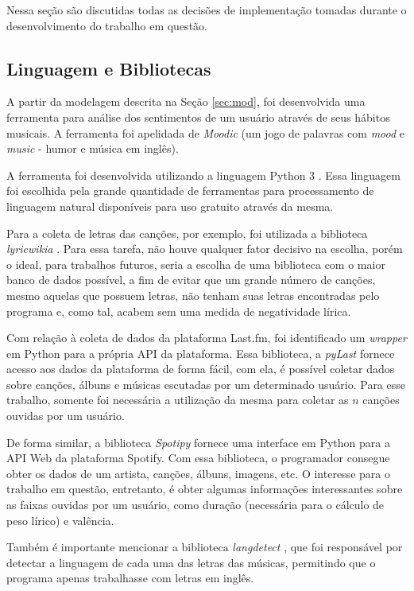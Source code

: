 Nessa seção são discutidas todas as decisões de implementação tomadas
durante o desenvolvimento do trabalho em questão.

\subsection{Linguagem e Bibliotecas}

A partir da modelagem descrita na Seção \ref{sec:mod}, foi desenvolvida
uma ferramenta para análise dos sentimentos de um usuário através de seus
hábitos musicais. A ferramenta foi apelidada de \textit{Moodic} (um jogo
de palavras com \textit{mood} e \textit{music} - humor e música em inglês).

A ferramenta foi desenvolvida utilizando a linguagem Python 3 \cite{python3}.
Essa linguagem foi escolhida pela grande quantidade de ferramentas para
processamento de linguagem natural disponíveis para uso gratuito através da
mesma.

Para a coleta de letras das canções, por exemplo, foi utilizada a biblioteca
\textit{lyricwikia} \cite{lyricwikia}. Para essa tarefa, não houve qualquer
fator decisivo na escolha, porém o ideal, para trabalhos futuros, seria
a escolha de uma biblioteca com o maior banco de dados possível, a fim
de evitar que um grande número de canções, mesmo aquelas que possuem letras,
não tenham suas letras encontradas pelo programa e, como tal, acabem sem
uma medida de negatividade lírica.

Com relação à coleta de dados da plataforma Last.fm, foi identificado um
\textit{wrapper} em Python para a própria API da plataforma. Essa biblioteca,
a \textit{pyLast} \cite{pylast} fornece acesso aos dados da plataforma de
forma fácil, com ela, é possível coletar dados sobre canções, álbuns e
músicas escutadas por um determinado usuário. Para esse trabalho, somente
foi necessária a utilização da mesma para coletar as $ n $ canções ouvidas
por um usuário.

De forma similar, a biblioteca \textit{Spotipy} \cite{spotipy} fornece uma
interface em Python para a API Web da plataforma Spotify. Com essa biblioteca,
o programador consegue obter os dados de um artista, canções, álbuns, imagens,
etc. O interesse para o trabalho em questão, entretanto, é obter algumas
informações interessantes sobre as faixas ouvidas por um usuário, como
duração (necessária para o cálculo de peso lírico) e valência.

Também é importante mencionar a biblioteca \textit{langdetect}
\cite{langdetect}, que foi responsável por detectar a linguagem de cada uma
das letras das músicas, permitindo que o programa apenas trabalhasse com
letras em inglês.

